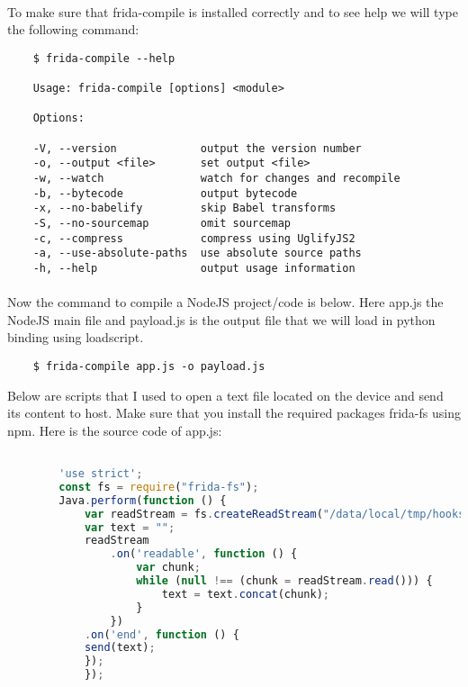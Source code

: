 \documentclass[../main.tex]{subfile}
\begin{document}
	\paragraph{} To make sure that frida-compile is installed correctly and to see help we will type the following command:
	\begin{lstlisting}
	$ frida-compile --help

	Usage: frida-compile [options] <module>
	
	Options:
	
	-V, --version             output the version number
	-o, --output <file>       set output <file>
	-w, --watch               watch for changes and recompile
	-b, --bytecode            output bytecode
	-x, --no-babelify         skip Babel transforms
	-S, --no-sourcemap        omit sourcemap
	-c, --compress            compress using UglifyJS2
	-a, --use-absolute-paths  use absolute source paths
	-h, --help                output usage information	

	\end{lstlisting}	
	
	\paragraph{} Now the command to compile a NodeJS project/code is below. Here app.js the NodeJS main file and payload.js is the output file that we will load in python binding using load\textunderscore script.
	\begin{lstlisting}
	$ frida-compile app.js -o payload.js
	\end{lstlisting}
	
	Below are scripts that I used to open a text file located on the device and send its content to host. Make sure that you install the required packages frida-fs \cite{frida_fs} using npm. Here is the source code of app.js:
	
	\begin{lstlisting}[language=JavaScript]

		'use strict';		
		const fs = require("frida-fs");
		Java.perform(function () {
			var readStream = fs.createReadStream("/data/local/tmp/hooks.json");
			var text = "";
			readStream
				.on('readable', function () {
					var chunk;
					while (null !== (chunk = readStream.read())) {
						text = text.concat(chunk);
					}
				})
			.on('end', function () {
			send(text);
			});
			});
	\end{lstlisting}
\end{document}
